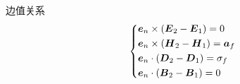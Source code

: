 \documentclass{mynote}
\begin{document}
\begin{theorem}{边值关系}
    \[
    \left\{
        \begin{aligned}
            & \boldsymbol{e}_n \times (\boldsymbol{E}_2 - \boldsymbol{E}_1) = 0 \\
            & \boldsymbol{e}_n \times (\boldsymbol{H}_2 - \boldsymbol{H}_1) = \boldsymbol{a}_f \\
            & \boldsymbol{e}_n \cdot (\boldsymbol{D}_2 - \boldsymbol{D}_1) = \sigma_f \\
            & \boldsymbol{e}_n \cdot (\boldsymbol{B}_2 - \boldsymbol{B}_1) = 0
        \end{aligned}
    \right.    
    \]
\end{theorem}
\end{document}
